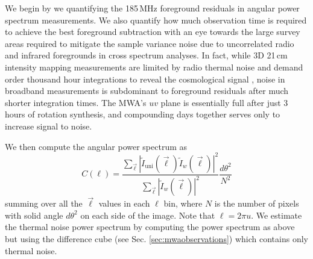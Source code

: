 \documentclass{emulateapj}
\begin{document}
We begin by we quantifying the 185\,MHz foreground residuals in angular power spectrum measurements. We also quantify how much observation time is required to achieve the best foreground subtraction with an eye towards the large survey areas required to mitigate the sample variance noise due to uncorrelated radio and infrared foregrounds in cross spectrum analyses. In fact, while 3D 21\,cm intensity mapping measurements are limited by radio thermal noise and demand order thousand hour integrations to reveal the cosmological signal \citep{beardsley13,PoberNextGen}, noise in broadband measurements is subdominant to foreground residuals after much shorter integration times. The MWA's $uv$ plane is essentially full after just 3 hours of rotation synthesis, and compounding days together serves only to increase signal to noise. 



We then compute the angular power spectrum as
\begin{equation}
	C(\ell)=\frac{\sum_{\vec{\ell}}|\tilde{I}_\text{uni}(\vec{\ell})\tilde{I}_w(\vec{\ell})|^2}{\sum_{\vec{\ell}}|\tilde{I}_w(\vec{\ell})|^2}\frac{d\theta^2}{N^2}
\end{equation}
summing over all the $\vec{\ell}$ values in each $\ell$ bin, where $N$ is the number of pixels with solid angle $d\theta^2$ on each side of the image. Note that $\ell=2\pi u$.  We estimate the thermal noise power spectrum by computing the power spectrum as above but using the difference cube (see Sec. \ref{sec:mwaobservations}) which contains only thermal noise.
\end{document}
